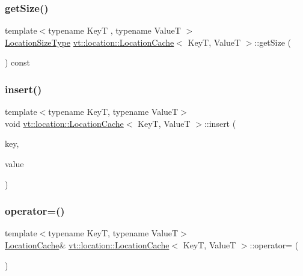 \subsubsection{\texorpdfstring{get\+Size()}{getSize()}}
{\footnotesize\ttfamily template$<$typename KeyT , typename ValueT $>$ \\
\hyperlink{namespacevt_1_1location_ab1c4c5849012a23eee2fbd1fce6159d7}{Location\+Size\+Type} \hyperlink{structvt_1_1location_1_1_location_cache}{vt\+::location\+::\+Location\+Cache}$<$ KeyT, ValueT $>$\+::get\+Size (\begin{DoxyParamCaption}{ }\end{DoxyParamCaption}) const}

\mbox{\label{structvt_1_1location_1_1_location_cache_a62020ee4735da790dd652f1cfcf2583d}} 
\subsubsection{\texorpdfstring{insert()}{insert()}}
{\footnotesize\ttfamily template$<$typename KeyT, typename ValueT$>$ \\
void \hyperlink{structvt_1_1location_1_1_location_cache}{vt\+::location\+::\+Location\+Cache}$<$ KeyT, ValueT $>$\+::insert (\begin{DoxyParamCaption}\item[{KeyT const \&}]{key,  }\item[{ValueT const \&}]{value }\end{DoxyParamCaption})}

\mbox{\label{structvt_1_1location_1_1_location_cache_ad57243480dae150942e6e4d8ede1bba8}} 
\subsubsection{\texorpdfstring{operator=()}{operator=()}}
{\footnotesize\ttfamily template$<$typename KeyT, typename ValueT$>$ \\
\hyperlink{structvt_1_1location_1_1_location_cache}{Location\+Cache}\& \hyperlink{structvt_1_1location_1_1_location_cache}{vt\+::location\+::\+Location\+Cache}$<$ KeyT, ValueT $>$\+::operator= (\begin{DoxyParamCaption}\item[{\hyperlink{structvt_1_1location_1_1_location_cache}{Location\+Cache}$<$ KeyT, ValueT $>$ const \&}]{ }\end{DoxyParamCaption})\hspace{0.3cm}{\ttfamily [delete]}}

